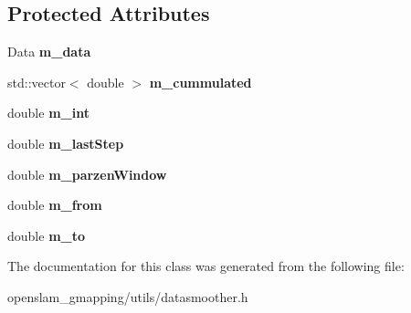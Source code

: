 \subsection*{Protected Attributes}
\begin{DoxyCompactItemize}
\item 
\mbox{\label{classGMapping_1_1DataSmoother_a514a05b6eb27d81990a60962b0a5a0d8}} 
Data {\bfseries m\+\_\+data}
\item 
\mbox{\label{classGMapping_1_1DataSmoother_a87e4082a9865afd681f2adf1abb1589c}} 
std\+::vector$<$ double $>$ {\bfseries m\+\_\+cummulated}
\item 
\mbox{\label{classGMapping_1_1DataSmoother_aa91b21892d6339f808a5def07ddc7f73}} 
double {\bfseries m\+\_\+int}
\item 
\mbox{\label{classGMapping_1_1DataSmoother_abd9ea769c0634c5bb8f58b63d95670bc}} 
double {\bfseries m\+\_\+last\+Step}
\item 
\mbox{\label{classGMapping_1_1DataSmoother_afe6466a46fe8175831482c8d4c0ece26}} 
double {\bfseries m\+\_\+parzen\+Window}
\item 
\mbox{\label{classGMapping_1_1DataSmoother_a1189615afeec570ddb4cfdbdb6896a38}} 
double {\bfseries m\+\_\+from}
\item 
\mbox{\label{classGMapping_1_1DataSmoother_a59dde49efd125d54a905fbd9659ae0c4}} 
double {\bfseries m\+\_\+to}
\end{DoxyCompactItemize}


The documentation for this class was generated from the following file\+:\begin{DoxyCompactItemize}
\item 
openslam\+\_\+gmapping/utils/datasmoother.\+h\end{DoxyCompactItemize}
